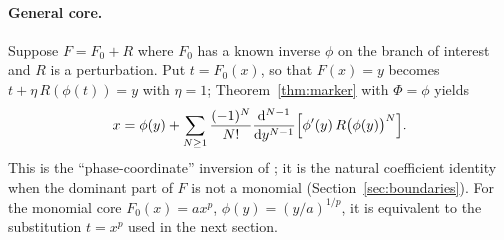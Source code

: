 \paragraph{General core.} Suppose $F=F_0+R$ where $F_0$ has a known inverse $\phi$ on the branch of interest and $R$ is a perturbation. Put $t=F_0(x)$, so that $F(x)=y$ becomes $t+\eta\,R(\phi(t))=y$ with $\eta=1$; Theorem~\ref{thm:marker} with $\Phi=\phi$ yields
\begin{equation}
 x=\phi(y)+\sum_{N\ge1}\frac{(-1)^N}{N!}\frac{\mathrm d^{N-1}}{\mathrm d y^{N-1}}\Bigl[\phi'(y)\,R\bigl(\phi(y)\bigr)^N\Bigr].
 \label{eq:general-core}
\end{equation}
This is the ``phase-coordinate'' inversion of \cite{proveit}; it is the natural coefficient identity when the dominant part of $F$ is not a monomial (Section~\ref{sec:boundaries}). For the monomial core $F_0(x)=ax^p$, $\phi(y)=(y/a)^{1/p}$, it is equivalent to the substitution $t=x^p$ used in the next section.
